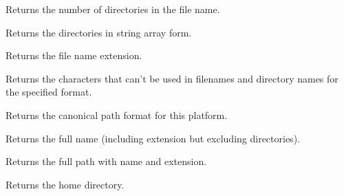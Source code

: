 


\label{wxfilenamegetdircount}


Returns the number of directories in the file name.


\label{wxfilenamegetdirs}


Returns the directories in string array form.


\label{wxfilenamegetext}


Returns the file name extension.


\label{wxfilenamegetforbiddenchars}


Returns the characters that can't be used in filenames and directory names for the specified format.


\label{wxfilenamegetformat}


Returns the canonical path format for this platform.


\label{wxfilenamegetfullname}


Returns the full name (including extension but excluding directories).


\label{wxfilenamegetfullpath}


Returns the full path with name and extension.


\label{wxfilenamegethomedir}


Returns the home directory.


\label{wxfilenamegetlongpath}

